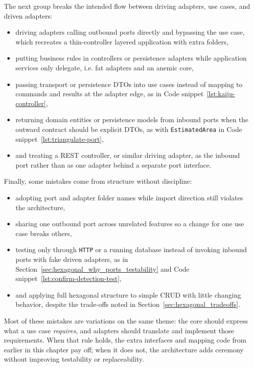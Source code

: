 The next group breaks the intended flow between driving adapters, use cases, and driven adapters:
\begin{itemize}
    \item driving adapters calling outbound ports directly and bypassing the use case, which recreates a thin-controller layered application with extra folders,
    \item putting business rules in controllers or persistence adapters while application services only delegate, i.e. fat adapters and an anemic core,
    \item passing transport or persistence DTOs into use cases instead of mapping to commands and results at the adapter edge, as in Code snippet~\ref{lst:kaiju-controller},
    \item returning domain entities or persistence models from inbound ports when the outward contract should be explicit DTOs, as with \texttt{EstimatedArea} in Code snippet~\ref{lst:triangulate-port},
    \item and treating a REST controller, or similar driving adapter, as the inbound port rather than as one adapter behind a separate port interface.
\end{itemize}

Finally, some mistakes come from structure without discipline:
\begin{itemize}
    \item adopting port and adapter folder names while import direction still violates the architecture,
    \item sharing one outbound port across unrelated features so a change for one use case breaks others,
    \item testing only through \texttt{HTTP} or a running database instead of invoking inbound ports with fake driven adapters, as in Section~\ref{sec:hexagonal_why_ports_testability} and Code snippet~\ref{lst:confirm-detection-test},
    \item and applying full hexagonal structure to simple CRUD with little changing behavior, despite the trade-offs noted in Section~\ref{sec:hexagonal_tradeoffs}.
\end{itemize}

Most of these mistakes are variations on the same theme: the core should express what a use case \textit{requires}, and adapters should translate and implement those requirements. When that rule holds, the extra interfaces and mapping code from earlier in this chapter pay off; when it does not, the architecture adds ceremony without improving testability or replaceability.

